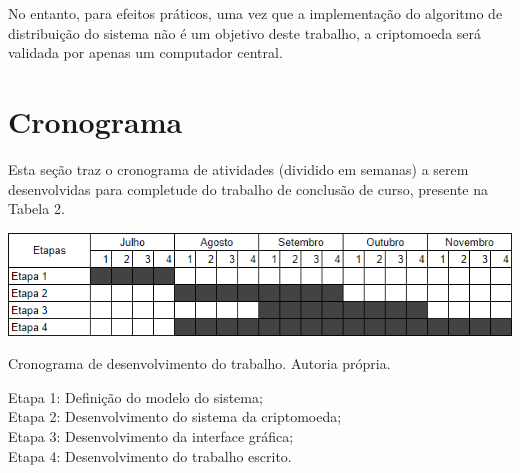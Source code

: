 \documentclass[openright]{normas-utf-tex} %
\begin{document}
No entanto, para efeitos práticos, uma vez que a implementação do algoritmo de distribuição do sistema não é um objetivo deste trabalho, a criptomoeda será validada por apenas um computador central.

\section{Cronograma}

Esta seção traz o cronograma de atividades (dividido em semanas) a serem desenvolvidas para completude do trabalho de conclusão de curso, presente na Tabela 2.

\begin{table}[ht]
\label{tbl:cronograma}
\centering
\includegraphics[width=.9\textwidth]{cronograma.PNG}
\caption{Cronograma de desenvolvimento do trabalho. Autoria própria.}
\end{table}
\noindent Etapa 1: Definição do modelo do sistema;\\
Etapa 2: Desenvolvimento do sistema da criptomoeda;\\
Etapa 3: Desenvolvimento da interface gráfica;\\
Etapa 4: Desenvolvimento do trabalho escrito.\\







\end{document}
